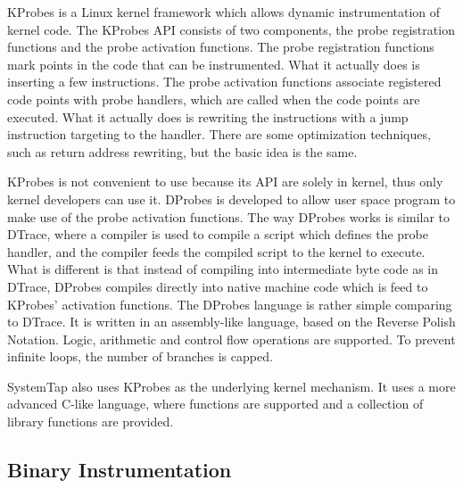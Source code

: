 KProbes is a Linux kernel framework which allows dynamic instrumentation
of kernel code.
The KProbes API consists of two components, the probe registration
functions and the probe activation functions.
The probe registration functions mark points in the code that can be
instrumented.
What it actually does is inserting a few  instructions.
The probe activation functions associate registered code points
with probe handlers, which are called when the code points are executed.
What it actually does is rewriting the  instructions with
a jump instruction targeting to the handler.
There are some optimization techniques, such as return address rewriting,
but the basic idea is the same.

KProbes is not convenient to use because its API are solely in kernel,
thus only kernel developers can use it.
DProbes is developed to allow user space program to make use of the
probe activation functions.
The way DProbes works is similar to DTrace, where a compiler
is used to compile a script which defines the probe handler,
and the compiler feeds the compiled script to the kernel
to execute.
What is different is that instead of compiling into intermediate
byte code as in DTrace, DProbes compiles directly into native machine code
which is feed to KProbes' activation functions.
The DProbes language is rather simple comparing to DTrace.
It is written in an assembly-like language,
based on the Reverse Polish Notation.
Logic, arithmetic and control flow operations are supported.
To prevent infinite loops, the number of branches is capped.

SystemTap also uses KProbes as the underlying kernel mechanism.
It uses a more advanced C-like language, where functions are
supported and a collection of library functions are provided.

\subsection{Binary Instrumentation}
\label{sec:instrumentation}

